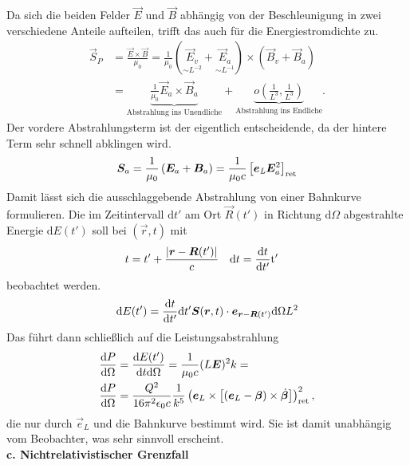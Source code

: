 Da sich die beiden Felder $\vec{E}$ und $\vec{B}$ abhängig von der Beschleunigung in zwei verschiedene Anteile aufteilen, trifft das auch für die Energiestromdichte zu.
\begin{align*}
\vec{S}_P &= \frac{\vec{E}\times\vec{B}}{\mu_0} = \frac{1}{\mu_0}(\underset{\sim L^{-2}}{\vec{E}_v}+\underset{\sim L^{-1}}{\vec{E}_a})\times(\vec{B}_v+\vec{B}_a) \\
&=\underbrace{\frac{1}{\mu_0}\vec{E}_a\times\vec{B}_a}_{\text{Abstrahlung ins Unendliche}} + \underbrace{o\left(\frac{1}{L^3},\frac{1}{L^3}\right)}_{\text{Abstrahlung ins Endliche}}.
\end{align*}
Der vordere Abstrahlungsterm ist der eigentlich entscheidende, da der hintere Term sehr schnell abklingen wird.
\begin{equation*}
\vec{S}_a = \frac{1}{\mu_0}\left(\vec{E}_a+\vec{B}_a\right) = 
\frac{1}{\mu_0c}\left[\vec{e}_\text{\textit{L}}\vec{E}_a^2\right]_{\text{ret}}
\end{equation*}
Damit lässt sich die ausschlaggebende Abstrahlung von einer Bahnkurve  formulieren.  Die im Zeitintervall $\mathrm{d}t'$ am Ort $\vec{R}(t')$ in Richtung $\mathrm{d}\Omega$ abgestrahlte Energie $\mathrm{d}E(t')$ soll bei $(\vec{r},t)$ mit
\begin{align*}
t &= t' + \frac{|\vec{r}-\vec{R}(t')|}{c} & \mathrm{d}t &= \diff{t}{t'}\mathrm{t'}
\end{align*} 
beobachtet werden. 
\begin{equation*}
\mathrm{d}E(t') = \diff{t}{t'}\mathrm{d}t'\vec{S}(\vec{r},t)\cdot\vec{e}_{\vec{r}-\vec{R}(t')}\mathrm{d}\Omega L^2
\end{equation*}
Das führt dann schließlich auf die Leistungsabstrahlung
\begin{align*}
\diff{P}{\Omega}&=\frac{\mathrm{d}E(t')}{\mathrm{d}t\mathrm{d}\Omega}=\frac{1}{\mu_0c}(L\vec{E})^2k = \\
\diff{P}{\Omega}&=\frac{Q^2}{16\pi^2\epsilon_0c}\frac{1}{k^5}\left(\vec{e}_L\times\left[(\vec{e}_L-\vec{\beta})\times\dot{\vec{\beta}}\right]\right)^2_\text{ret},
\end{align*}
die nur durch $\vec{e}_L$ und die Bahnkurve bestimmt wird. Sie ist damit unabhängig vom Beobachter, was sehr sinnvoll erscheint. \\

\textbf{c. Nichtrelativistischer Grenzfall}\\

